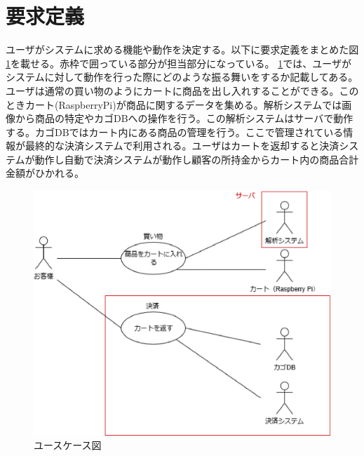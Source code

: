 \section{要求定義}
ユーザがシステムに求める機能や動作を決定する。以下に要求定義をまとめた図\ref{usecase}を載せる。赤枠で囲っている部分が担当部分になっている。
\ref{usecase}では、ユーザがシステムに対して動作を行った際にどのような振る舞いをするか記載してある。ユーザは通常の買い物のようにカートに商品を出し入れすることができる。このときカート(RaspberryPi)が商品に関するデータを集める。解析システムでは画像から商品の特定やカゴDBへの操作を行う。この解析システムはサーバで動作する。カゴDBではカート内にある商品の管理を行う。ここで管理されている情報が最終的な決済システムで利用される。ユーザはカートを返却すると決済システムが動作し自動で決済システムが動作し顧客の所持金からカート内の商品合計金額がひかれる。

\begin{figure}[htbp]
\centering
\includegraphics[width=12cm]{./pic/usecase_saishu.eps}
\caption{ユースケース図}
\label{usecase}
\end{figure}